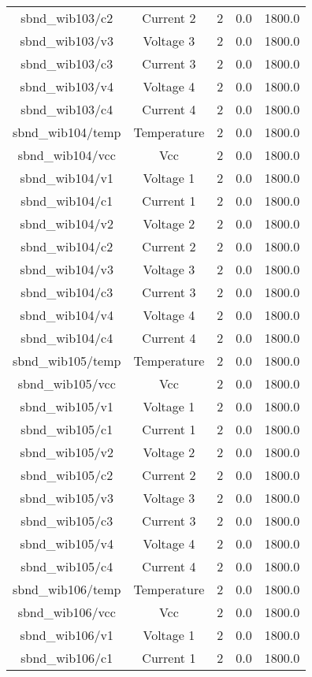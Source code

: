 \begin{center}
\begin{longtable}{c | c c c c }
sbnd\_wib103/c2 & Current 2 & 2 & 0.0 & 1800.0\\ 
sbnd\_wib103/v3 & Voltage 3 & 2 & 0.0 & 1800.0\\ 
sbnd\_wib103/c3 & Current 3 & 2 & 0.0 & 1800.0\\ 
sbnd\_wib103/v4 & Voltage 4 & 2 & 0.0 & 1800.0\\ 
sbnd\_wib103/c4 & Current 4 & 2 & 0.0 & 1800.0\\ 
sbnd\_wib104/temp & Temperature & 2 & 0.0 & 1800.0\\ 
sbnd\_wib104/vcc & Vcc & 2 & 0.0 & 1800.0\\ 
sbnd\_wib104/v1 & Voltage 1 & 2 & 0.0 & 1800.0\\ 
sbnd\_wib104/c1 & Current 1 & 2 & 0.0 & 1800.0\\ 
sbnd\_wib104/v2 & Voltage 2 & 2 & 0.0 & 1800.0\\ 
sbnd\_wib104/c2 & Current 2 & 2 & 0.0 & 1800.0\\ 
sbnd\_wib104/v3 & Voltage 3 & 2 & 0.0 & 1800.0\\ 
sbnd\_wib104/c3 & Current 3 & 2 & 0.0 & 1800.0\\ 
sbnd\_wib104/v4 & Voltage 4 & 2 & 0.0 & 1800.0\\ 
sbnd\_wib104/c4 & Current 4 & 2 & 0.0 & 1800.0\\ 
sbnd\_wib105/temp & Temperature & 2 & 0.0 & 1800.0\\ 
sbnd\_wib105/vcc & Vcc & 2 & 0.0 & 1800.0\\ 
sbnd\_wib105/v1 & Voltage 1 & 2 & 0.0 & 1800.0\\ 
sbnd\_wib105/c1 & Current 1 & 2 & 0.0 & 1800.0\\ 
sbnd\_wib105/v2 & Voltage 2 & 2 & 0.0 & 1800.0\\ 
sbnd\_wib105/c2 & Current 2 & 2 & 0.0 & 1800.0\\ 
sbnd\_wib105/v3 & Voltage 3 & 2 & 0.0 & 1800.0\\ 
sbnd\_wib105/c3 & Current 3 & 2 & 0.0 & 1800.0\\ 
sbnd\_wib105/v4 & Voltage 4 & 2 & 0.0 & 1800.0\\ 
sbnd\_wib105/c4 & Current 4 & 2 & 0.0 & 1800.0\\ 
sbnd\_wib106/temp & Temperature & 2 & 0.0 & 1800.0\\ 
sbnd\_wib106/vcc & Vcc & 2 & 0.0 & 1800.0\\ 
sbnd\_wib106/v1 & Voltage 1 & 2 & 0.0 & 1800.0\\ 
sbnd\_wib106/c1 & Current 1 & 2 & 0.0 & 1800.0\\ 

\end{longtable}
\end{center}
